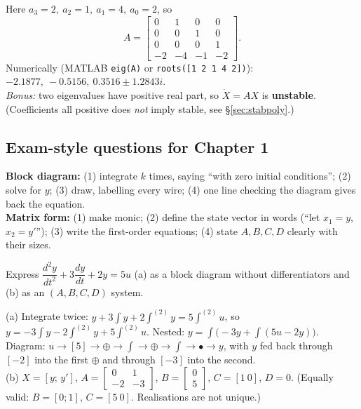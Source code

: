 \begin{workbox}[title={Worked example (AE2, A2.2): matrix with $\chi_A(s)=s^4+2s^3+s^2+4s+2$}]
Here $a_3=2,\ a_2=1,\ a_1=4,\ a_0=2$, so
\[ A=\begin{bmatrix}0&1&0&0\\0&0&1&0\\0&0&0&1\\-2&-4&-1&-2\end{bmatrix}. \]
Numerically (MATLAB \texttt{eig(A)} or \texttt{roots([1 2 1 4 2])}): $-2.1877,\ -0.5156,\ 0.3516\pm1.2843i$.\\
\textit{Bonus:} two eigenvalues have positive real part, so $\dot X=AX$ is \textbf{unstable}. (Coefficients all positive does \emph{not} imply stable, see \S\ref{sec:stabpoly}.)
\end{workbox}

\subsection{Exam-style questions for Chapter 1}\label{ss:1-6}
\begin{answerbox}
\textbf{Block diagram:} (1) integrate $k$ times, saying ``with zero initial conditions''; (2) solve for $y$; (3) draw, labelling every wire; (4) one line checking the diagram gives back the equation.\\
\textbf{Matrix form:} (1) make monic; (2) define the state vector in words (``let $x_1=y$, $x_2=y'$''); (3) write the first-order equations; (4) state $A,B,C,D$ clearly with their sizes.
\end{answerbox}
\begin{qbox}[title={Q1.1 (easy)}]
Express $\dfrac{d^2y}{dt^2}+3\dfrac{dy}{dt}+2y=5u$ (a) as a block diagram without differentiators and (b) as an $(A,B,C,D)$ system.
\end{qbox}
\begin{solbox}
(a) Integrate twice: $y+3\int y+2\int^{(2)}y=5\int^{(2)}u$, so $y=-3\int y-2\int^{(2)}y+5\int^{(2)}u$.
Nested: $y=\int\big(-3y+\int(5u-2y)\big)$. Diagram: $u\to[5]\to\oplus\to\int\to\oplus\to\int\to\bullet\to y$, with $y$ fed back through $[-2]$ into the first $\oplus$ and through $[-3]$ into the second.\\
(b) $X=[y;\,y']$, $A=\begin{bmatrix}0&1\\-2&-3\end{bmatrix}$, $B=\begin{bmatrix}0\\5\end{bmatrix}$, $C=[1\ 0]$, $D=0$.
(Equally valid: $B=[0;1]$, $C=[5\ 0]$. Realisations are not unique.)
\end{solbox}

